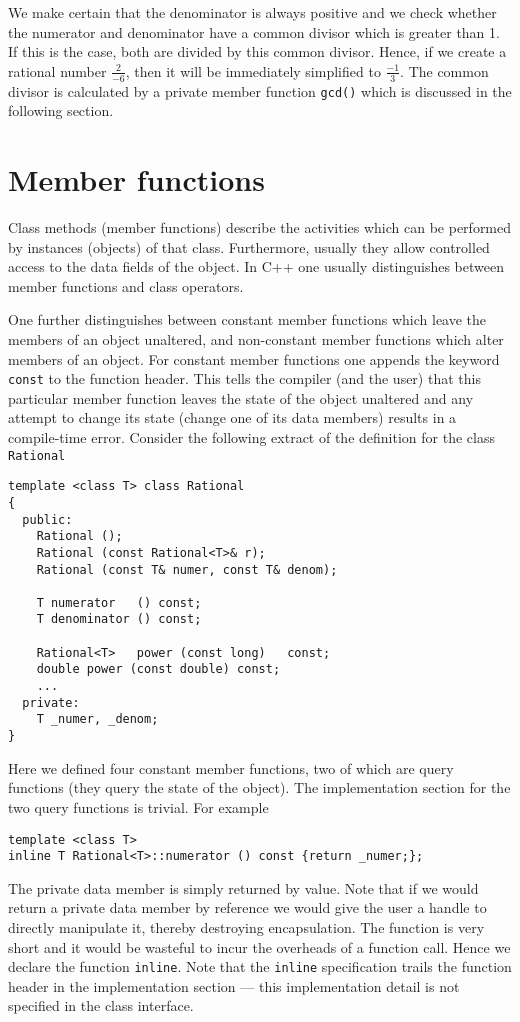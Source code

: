 We make certain that the denominator is always positive and
we check whether the numerator and denominator have a common
divisor which is greater than 1. If this is the case, both are divided by
this common divisor. Hence, if we create a rational number
$\frac{2}{-6}$, then it will be immediately simplified to 
$\frac{-1}{3}$. The common divisor is calculated by a private
member function \verb+gcd()+ which is discussed in the
following section.


\section{Member functions\label{secADTTemplatesMemberfunctions}}

Class methods (member functions) describe the activities which 
can be performed by instances (objects) of that class. 
Furthermore, usually they allow controlled access to the data fields 
of the object. In C++ one usually distinguishes between member
functions and class operators.

One further distinguishes between constant member
functions which leave the members of an object 
unaltered, and non-constant member functions which alter members
of an object. For constant member functions one appends the keyword
\verb+const+ to the function header. This tells the compiler (and the
user) that this particular member function leaves the state of the
object unaltered and any attempt to change its state (change one
of its data members) results in a compile-time error. Consider the 
following extract of the definition for the class \verb+Rational+
{\footnotesize \begin{verbatim}
template <class T> class Rational
{
  public:
    Rational ();
    Rational (const Rational<T>& r);
    Rational (const T& numer, const T& denom);
 
    T numerator   () const;
    T denominator () const;

    Rational<T>   power (const long)   const;
    double power (const double) const;
    ...
  private:
    T _numer, _denom;
}
\end{verbatim}}
Here we defined four constant member functions, two of which are
query functions (they query the state of the object). The implementation
section for the two query functions is trivial. For example
{\footnotesize \begin{verbatim}
template <class T>
inline T Rational<T>::numerator () const {return _numer;};
\end{verbatim}}
The private data member is simply returned by value. Note that if we 
would return a private data member by reference we would give the
user a handle to directly manipulate it, thereby destroying encapsulation.
The function is very
short and it would be wasteful to incur the overheads of a function call.
Hence we declare the function \verb+inline+. Note that the \verb+inline+
specification trails the function header in the implementation section ---
this implementation detail is not specified in the class interface.

